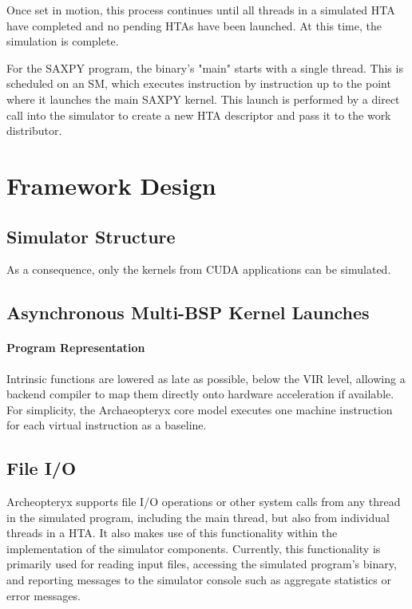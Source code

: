 \documentclass[conference, 10pt]{IEEEtran}
\begin{document}
Once set in motion, this process continues until all threads in a simulated HTA
have completed and no pending HTAs have been launched.  At this time, the
simulation is complete.

For the SAXPY program, the binary's "main" starts with a single thread.  This is
scheduled on an SM, which executes instruction by instruction up to the point
where it launches the main SAXPY kernel.  This launch is performed by a direct
call into the simulator to create a new HTA descriptor and pass it to the work
distributor.  






\section{Framework Design}
\label{sec:framework-design}

\subsection{Simulator Structure}

As a consequence, only the kernels from CUDA applications can be simulated.  

\subsection{Asynchronous Multi-BSP Kernel Launches}

\paragraph{Program Representation}

Intrinsic functions are lowered as late as possible, below the
VIR level, allowing a backend compiler to map them directly onto hardware
acceleration if available.  For simplicity, the Archaeopteryx core model
executes one machine instruction for each virtual instruction as a baseline.

%
%

\subsection{File I/O}
Archeopteryx supports file I/O operations or other system calls from any thread
in the simulated program, including the main thread, but also from individual
threads in a HTA.  It also makes use of this functionality within the
implementation of the simulator components. Currently, this functionality is
primarily used for reading input files, accessing the simulated program's
binary, and reporting messages to the simulator console such as aggregate
statistics or error messages. 
\end{document}
